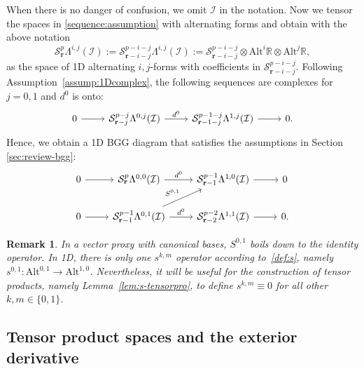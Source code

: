 \documentclass[final]{amsart}%
\newtheorem{remark}{Remark}
\newcommand{\0}{\mathaccent23}
\newcommand \alt{\mathrm{Alt}}
\newcommand{\br}{\mathbf r}
\begin{document}
When there is no danger of confusion, we omit $\mathcal{I}$ in the notation. 
Now we tensor the spaces in \eqref{sequence:assumption} with alternating forms and obtain with the above notation
\begin{equation}\label{def:Sp}
  \mathscr{S}_{\br}^p\Lambda^{i, j}(\mathcal{I})
  :=\mathcal{S}_{\br-i-j}^{p-i-j}\Lambda^{i, j}(\mathcal{I})
  :=\mathcal{S}_{\br-i-j}^{p-i-j}\otimes \alt^{i}\mathbb{R}\otimes \alt^j\mathbb{R},
\end{equation}
as the space of 1D alternating $i, j$-forms with coefficients in $\mathcal{S}_{\br-i-j}^{p-i-j}$. 
 Following Assumption~\ref{assump:1Dcomplex}, the following sequences are complexes for $j=0,1$ and $d^0$ is onto:
\begin{equation}\label{1D-ijcomplex}
\begin{tikzcd}
0 \arrow{r}&\mathcal{S}_{\br-j}^{p-j}\Lambda^{0, j}(\mathcal{I}) \arrow{r}{d^{0}}& \mathcal{S}_{\br-1-j}^{p-1-j}\Lambda^{1, j}(\mathcal{I})\arrow{r}{}&0.
\end{tikzcd}
\end{equation} 
Hence, we obtain a 1D BGG diagram that satisfies the assumptions in Section \ref{sec:review-bgg}:
 \begin{equation}\label{1D:BGG-diagram}
\begin{tikzcd}
0 \arrow{r} &\mathcal{S}_{\br}^{p}\Lambda^{0, 0} (\mathcal{I}) \arrow{r}{d^{0}} &\mathcal{S}_{\br-1}^{p-1}\Lambda^{1,0} (\mathcal{I})\arrow{r}{} & 0\\
0 \arrow{r} &\mathcal{S}_{\br-1}^{p-1}\Lambda^{0, 1}(\mathcal{I})\arrow{r}{d^{0}} \arrow[ur, "S^{0, 1}"]&\mathcal{S}_{\br-2}^{p-2}\Lambda^{1, 1}(\mathcal{I}) \arrow{r}{} & 0.
 \end{tikzcd}
\end{equation}

\begin{remark}
\label{rem:s}
In a vector proxy with canonical bases, $S^{0, 1}$ boils down to the identity operator. In 1D, there is only one $s^{k,m}$ operator according to~\eqref{def:s}, namely $s^{0,1}\colon \alt^{0,1}\to \alt^{1,0}$. Nevertheless, it will be useful for the construction of tensor products, namely Lemma~\ref{lem:s-tensorpro}, to define $s^{k,m}\equiv 0$ for all other $k,m\in\{0,1\}$.
\end{remark}

\subsection{Tensor product spaces and the exterior derivative}\label{sec:tsp_extderivs}
\end{document}
